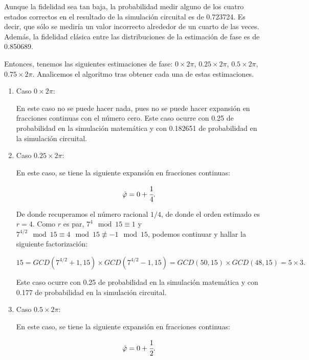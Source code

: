 Aunque la fidelidad sea tan baja, la probabilidad medir alguno de los cuatro estados correctos en el resultado de la simulación circuital es de 0.723724. Es decir, que sólo se mediría un valor incorrecto alrededor de un cuarto de las veces. Además, la fidelidad clásica entre las distribuciones de la estimación de fase es de 0.850689.

Entonces, tenemos las siguientes estimaciones de fase: $0 \times 2\pi$, $0.25 \times 2\pi$, $0.5 \times 2\pi$, $0.75 \times 2\pi$. Analicemos el algoritmo tras obtener cada una de estas estimaciones.

\begin{enumerate}
    \item Caso $0 \times 2\pi$:

        En este caso no se puede hacer nada, pues no se puede hacer expansión en fracciones continuas con el número cero. Este caso ocurre con 0.25 de probabilidad en la simulación matemática y con 0.182651 de probabilidad en la simulación circuital.

    \item Caso $0.25 \times 2\pi$:

        En este caso, se tiene la siguiente expansión en fracciones continuas:
        
        \begin{equation}
            \tilde{\varphi} = 0 + \cfrac{1}{4} .
        \end{equation}
        
        De donde recuperamos el número racional $1/4$, de donde el orden estimado es $r = 4$. Como $r$ es par, $7^{4}\mod 15 \equiv 1$ y $7^{4/2}\mod 15 \equiv 4\mod 15 \not\equiv -1\mod 15$, podemos continuar y hallar la siguiente factorización:

        \begin{equation}
            15 = GCD(7^{4/2} + 1, 15) \times GCD(7^{4/2} - 1, 15) = GCD(50, 15) \times GCD(48, 15) = 5 \times 3 .
        \end{equation}

        Este caso ocurre con 0.25 de probabilidad en la simulación matemática y con 0.177 de probabilidad en la simulación circuital.

    \item Caso $0.5 \times 2\pi$:

        En este caso, se tiene la siguiente expansión en fracciones continuas:

        \begin{equation}
            \tilde{\varphi} = 0 + \cfrac{1}{2} .
        \end{equation}
        

\end{enumerate}
